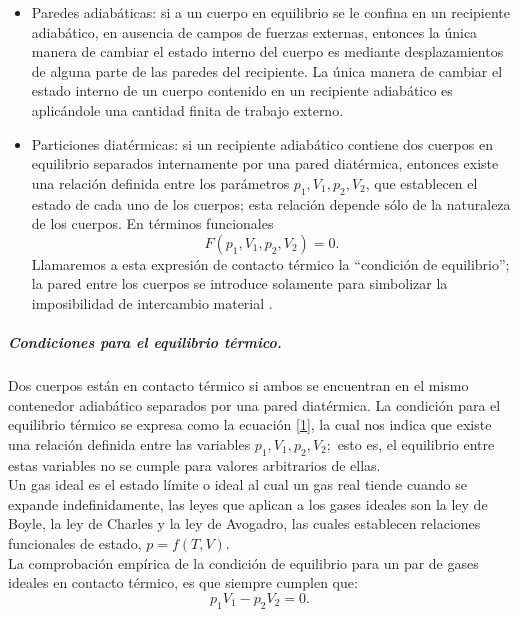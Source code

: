 \documentclass{article}
\theoremstyle{definition} \newtheorem{defi}{Definici\'on}
\theoremstyle{definition} \newtheorem{teo}{Teorema}
\theoremstyle{definition} \newtheorem{cor}{Corolario}
\begin{document}
\begin{itemize}
\item Paredes adiab\'aticas: si a un cuerpo en equilibrio se le confina en un recipiente adiab\'atico, en ausencia de campos de fuerzas externas, entonces la \'unica manera de cambiar el estado interno del cuerpo es mediante desplazamientos de alguna parte de las paredes del recipiente. La \'unica manera de cambiar el estado interno de un cuerpo contenido en un recipiente adiab\'atico es aplic\'andole una cantidad finita de trabajo externo.
\item Particiones diat\'ermicas: si un recipiente adiab\'atico contiene dos cuerpos en equilibrio separados internamente por una pared diat\'ermica, entonces existe una relaci\'on definida entre los par\'ametros $p_1,V_1,p_2,V_2$, que establecen el estado de cada uno de los cuerpos; esta relaci\'on depende s\'olo de la naturaleza de los cuerpos. En t\'erminos funcionales
\begin{equation}\label{1}
F(p_1, V_1, p_2, V_2)=0.
\end{equation}
Llamaremos a esta expresi\'on de contacto t\'ermico la ``condici\'on de equilibrio''; la pared entre los cuerpos se introduce solamente para simbolizar la imposibilidad de intercambio material \cite{MB}.
\end{itemize}
\subparagraph{Condiciones para el equilibrio t\'ermico.}
Dos cuerpos est\'an en contacto t\'ermico si ambos se encuentran en el mismo contenedor adiab\'atico separados por una pared diat\'ermica. La condici\'on para el equilibrio t\'ermico se expresa como la ecuaci\'on \eqref{1}, la cual nos indica que existe una relaci\'on definida entre las variables $p_1, V_1, p_2, V_2;$ esto es, el equilibrio entre estas variables no se cumple para valores arbitrarios de ellas.\\
Un gas ideal es el estado l\'imite o ideal al cual un gas real tiende cuando se expande indefinidamente, las leyes que aplican a los gases ideales son la ley de Boyle, la ley de Charles y la ley de Avogadro, las cuales establecen relaciones funcionales de estado, $p=f(T,V).$\\
La comprobaci\'on emp\'irica de la condici\'on de equilibrio para un par de gases ideales en contacto t\'ermico, es que siempre cumplen que:
\begin{equation*}
p_1V_1-p_2V_2=0.
\end{equation*}
\end{document}
